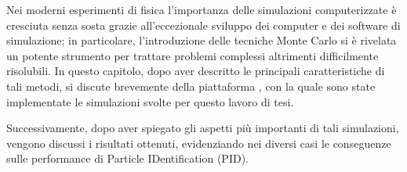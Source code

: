 






Nei moderni esperimenti di fisica l'importanza delle simulazioni computerizzate è cresciuta senza sosta grazie all'eccezionale sviluppo dei computer e dei software di simulazione; in particolare, l'introduzione delle tecniche Monte Carlo si è rivelata un potente strumento per trattare problemi complessi altrimenti difficilmente risolubili.
In questo capitolo, dopo aver descritto le principali caratteristiche di tali metodi, si discute brevemente della piattaforma \geant, con la quale sono state implementate le simulazioni svolte per questo lavoro di tesi.

Successivamente, dopo aver spiegato gli aspetti più importanti di tali simulazioni, vengono discussi i risultati ottenuti, evidenziando nei diversi casi le conseguenze sulle performance di Particle IDentification (PID).





\section{}


